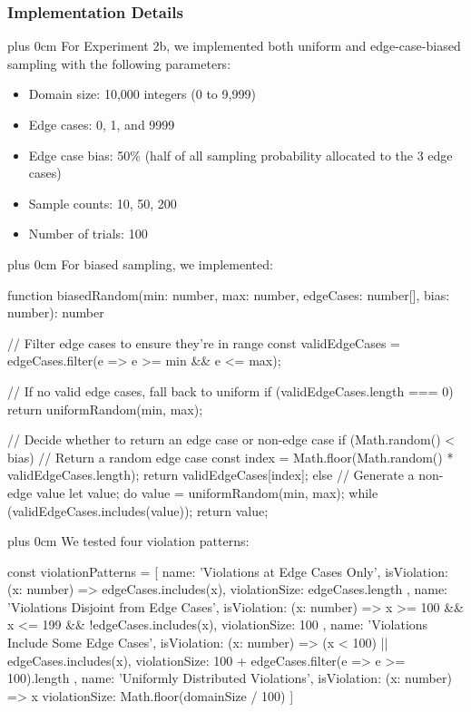 \documentclass[11pt,a4paper]{article}
\newcommand{\justifytext}{\leftskip=0pt \rightskip=0pt plus 0cm}
\begin{document}
\subsubsection{Implementation Details}

\justifytext
For Experiment 2b, we implemented both uniform and edge-case-biased sampling with the following parameters:

\begin{itemize}
\item Domain size: 10,000 integers (0 to 9,999)
\item Edge cases: 0, 1, and 9999
\item Edge case bias: 50\% (half of all sampling probability allocated to the 3 edge cases)
\item Sample counts: 10, 50, 200
\item Number of trials: 100
\end{itemize}

\justifytext
For biased sampling, we implemented:

\begin{wrappedcode}
function biasedRandom(min: number, max: number, edgeCases: number[], bias: number): number {
  // Filter edge cases to ensure they're in range
  const validEdgeCases = edgeCases.filter(e => e >= min && e <= max);
  
  // If no valid edge cases, fall back to uniform
  if (validEdgeCases.length === 0) {
    return uniformRandom(min, max);
  }
  
  // Decide whether to return an edge case or non-edge case
  if (Math.random() < bias) {
    // Return a random edge case
    const index = Math.floor(Math.random() * validEdgeCases.length);
    return validEdgeCases[index];
  } else {
    // Generate a non-edge value
    let value;
    do {
      value = uniformRandom(min, max);
    } while (validEdgeCases.includes(value));
    return value;
  }
}
\end{wrappedcode}

\justifytext
We tested four violation patterns:

\begin{wrappedcode}
const violationPatterns = [
  { 
    name: 'Violations at Edge Cases Only',
    isViolation: (x: number) => edgeCases.includes(x),
    violationSize: edgeCases.length
  },
  { 
    name: 'Violations Disjoint from Edge Cases',
    isViolation: (x: number) => x >= 100 && x <= 199 && !edgeCases.includes(x),
    violationSize: 100
  },
  { 
    name: 'Violations Include Some Edge Cases',
    isViolation: (x: number) => (x < 100) || edgeCases.includes(x),
    violationSize: 100 + edgeCases.filter(e => e >= 100).length
  },
  { 
    name: 'Uniformly Distributed Violations',
    isViolation: (x: number) => x %
    violationSize: Math.floor(domainSize / 100)
  }
]
\end{wrappedcode}
\end{document}
